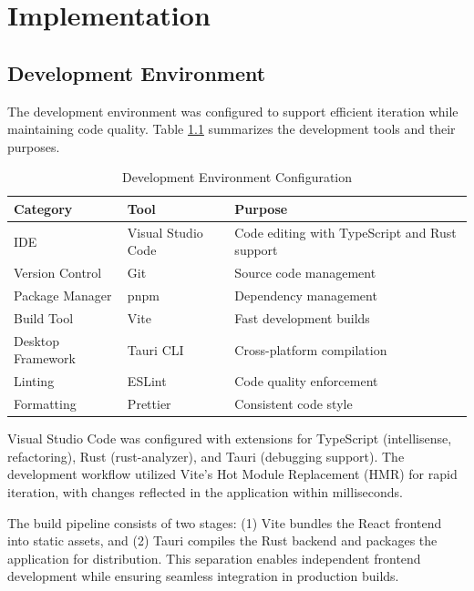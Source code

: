 
\chapter{Implementation}
\label{chap:implementation}

\section{Development Environment}
\label{sec:dev-environment}

\completed

The development environment was configured to support efficient iteration while maintaining code quality. Table \ref{tab:dev-tools} summarizes the development tools and their purposes.

\begin{table}[htbp]
\centering
\caption{Development Environment Configuration}
\label{tab:dev-tools}
\begin{tabular}{@{}lll@{}}
\toprule
\textbf{Category} & \textbf{Tool} & \textbf{Purpose} \\
\midrule
IDE & Visual Studio Code & Code editing with TypeScript and Rust support \\
Version Control & Git & Source code management \\
Package Manager & pnpm & Dependency management \\
Build Tool & Vite & Fast development builds \\
Desktop Framework & Tauri CLI & Cross-platform compilation \\
Linting & ESLint & Code quality enforcement \\
Formatting & Prettier & Consistent code style \\
\bottomrule
\end{tabular}
\end{table}

Visual Studio Code was configured with extensions for TypeScript (intellisense, refactoring), Rust (rust-analyzer), and Tauri (debugging support). The development workflow utilized Vite's Hot Module Replacement (HMR) for rapid iteration, with changes reflected in the application within milliseconds.

The build pipeline consists of two stages: (1) Vite bundles the React frontend into static assets, and (2) Tauri compiles the Rust backend and packages the application for distribution. This separation enables independent frontend development while ensuring seamless integration in production builds.

